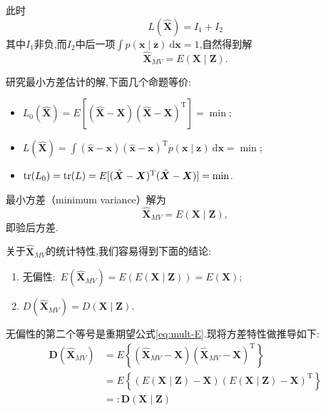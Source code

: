 \documentclass[cn,10pt,citestyle=gb7714-2015,bibstyle=gb7714-2015]{elegantbook}
\newcommand{\md}{\ \mathrm{d}}
\newcommand{\mT}{\mathrm{T}}
\newcommand{\tr}{\textup{tr}}
\begin{document}
此时
\[
    L(\hat{\bm{X}})=I_1+I_2
\]
其中$I_1$非负,而$I_2$中后一项$\int p(\bm{x}\mid\bm{z})\md\bm{x}=1$,自然得到解
\[
  \hat{\bm{X}}_{MV}=E(\bm{X}\mid\bm{Z}).
\]
\begin{theorem}[最小方差估计原理]\label{thm:MV-estimation-principle}
  研究最小方差估计的解,下面几个命题等价:
  \begin{itemize}
    \item $L_0(\hat{\bm{X}})=E[(\hat{\bm{X}}-\bm{X})(\hat{\bm{X}}-\bm{X})^\mT]=\min$;
    \item $\displaystyle L(\hat{\bm{X}})=\int (\hat{\bm{x}}-\bm{x})(\hat{\bm{x}}-\bm{x})^\mT p(\bm{x}\mid\bm{z})\md\bm{x}=\min$;
    \item $\tr(L_0)=\tr(L)=E[(\hat{\bm{X}}-\bm{X})^\mT(\hat{\bm{X}}-\bm{X})]=\min$.
  \end{itemize}
  最小方差（minimum variance）解为
  \begin{equation}
    \hat{\bm{X}}_{MV}=E(\bm{X}\mid\bm{Z}),
  \end{equation}
  即验后方差.
\end{theorem}
关于$\hat{\bm{X}}_{MV}$的统计特性,我们容易得到下面的结论:
\begin{theorem}[最小方差解的统计特性]\label{thm:MV-EandD}
  \begin{enumerate}
    \item 无偏性:\ $E(\hat{\bm{X}}_{MV})=E(E(\bm{X}\mid\bm{Z}))=E(\bm{X})$;
    \item $D(\hat{\bm{X}}_{MV})=D(\bm{X}\mid\bm{Z})$.
  \end{enumerate}
\end{theorem}
无偏性的第二个等号是重期望公式\eqref{eq:mult-E}.现将方差特性做推导如下:
\begin{align*}
  \bm{D}(\hat{\bm{X}}_{MV})&=E\left\{(\hat{\bm{X}}_{MV}-\bm{X})(\hat{\bm{X}}_{MV}-\bm{X})^\mT\right\}\\
  &=E\left\{(E(\bm{X}\mid\bm{Z})-\bm{X})(E(\bm{X}\mid\bm{Z})-\bm{X})^\mT\right\}\\
  &=:\bm{D}(\bm{X}\mid\bm{Z})
\end{align*}
\end{document}
